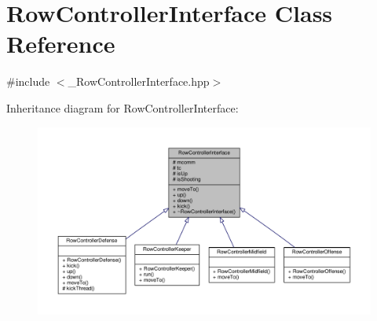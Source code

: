 \hypertarget{class_row_controller_interface}{}\section{Row\+Controller\+Interface Class Reference}
\label{class_row_controller_interface}


{\ttfamily \#include $<$\+\_\+\+Row\+Controller\+Interface.\+hpp$>$}



Inheritance diagram for Row\+Controller\+Interface\+:\nopagebreak
\begin{figure}[H]
\begin{center}
\leavevmode
\includegraphics[width=350pt]{class_row_controller_interface__inherit__graph}
\end{center}
\end{figure}


